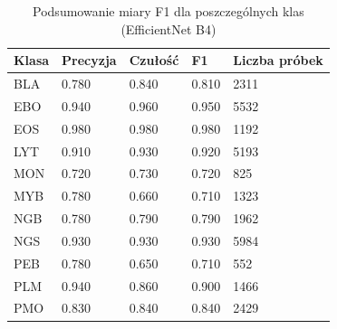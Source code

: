 \begin{table}
    \caption{Podsumowanie miary F1 dla poszczególnych klas (EfficientNet B4)}
    \begin{center}
        \begin{tabular}{|l|l|l|l|l|}
            \hline
            Klasa & Precyzja & Czułość & F1    & Liczba próbek \\
            \hline
            BLA   & 0.780    & 0.840   & 0.810 & 2311          \\
            \hline
            EBO   & 0.940    & 0.960   & 0.950 & 5532          \\
            \hline
            EOS   & 0.980    & 0.980   & 0.980 & 1192          \\
            \hline
            LYT   & 0.910    & 0.930   & 0.920 & 5193          \\
            \hline
            MON   & 0.720    & 0.730   & 0.720 & 825           \\
            \hline
            MYB   & 0.780    & 0.660   & 0.710 & 1323          \\
            \hline
            NGB   & 0.780    & 0.790   & 0.790 & 1962          \\
            \hline
            NGS   & 0.930    & 0.930   & 0.930 & 5984          \\
            \hline
            PEB   & 0.780    & 0.650   & 0.710 & 552           \\
            \hline
            PLM   & 0.940    & 0.860   & 0.900 & 1466          \\
            \hline
            PMO   & 0.830    & 0.840   & 0.840 & 2429          \\
            \hline
        \end{tabular}
    \end{center}
    \label{tab:f1_summary}
\end{table}

